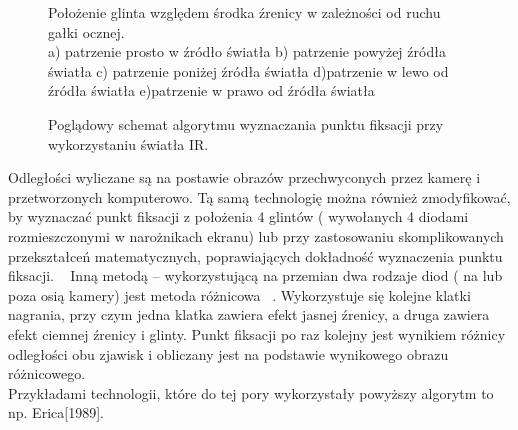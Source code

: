 \documentclass[twoside,a4paper]{book}
\begin{document}
\begin{figure}[!h]
		\centering
		\caption{Położenie glinta względem środka źrenicy w zależności od ruchu gałki ocznej. \\
a) patrzenie prosto w źródło światła b) patrzenie powyżej źródła światła c) patrzenie poniżej źródła światła d)patrzenie w lewo od źródła światła e)patrzenie w prawo od źródła światła 
}
		\label{fig:glint}
	\end{figure}
	
\begin{figure}[!h]

		\centering		
		\caption{Poglądowy schemat algorytmu wyznaczania punktu fiksacji przy wykorzystaniu światła IR. }
		\label{fig:glintUML}
	\end{figure}
	
Odległości wyliczane są  na postawie obrazów przechwyconych  przez kamerę i przetworzonych komputerowo.  
Tą samą technologię można również zmodyfikować, by wyznaczać punkt fiksacji  z położenia 4 glintów ( wywołanych 4 diodami rozmieszczonymi w narożnikach ekranu) lub przy zastosowaniu skomplikowanych  przekształceń matematycznych,  poprawiających dokładność  wyznaczenia punktu fiksacji. ~\cite{kunkaFiksacja}
Inną metodą – wykorzystującą  na przemian dwa rodzaje diod ( na lub poza osią kamery) jest metoda różnicowa ~\cite{kunkaFiksacja}. Wykorzystuje się kolejne klatki nagrania, przy czym jedna klatka zawiera efekt jasnej źrenicy, a druga zawiera efekt ciemnej źrenicy i glinty. Punkt fiksacji po raz kolejny jest wynikiem różnicy odległości obu zjawisk i obliczany jest na podstawie wynikowego obrazu różnicowego.\\
Przykładami technologii, które do tej pory wykorzystały powyższy algorytm to np. Erica[1989].
\end{document}
